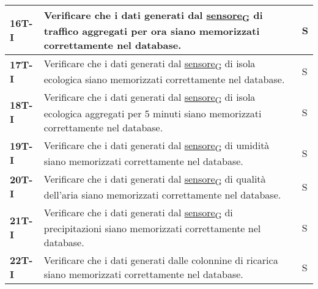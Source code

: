 \begin{longtable}{|>{\raggedright\arraybackslash}m{}|>{\raggedright\arraybackslash}m{}|>{\raggedright\arraybackslash}m{}|}
	\hline
	\textbf{16T-I}  & Verificare che i dati generati dal \href{https://7last.github.io/docs/rtb/documentazione-interna/glossario\#sensore}{sensore\textsubscript{G}} di traffico aggregati per ora siano memorizzati correttamente nel database.                                                                                                          & S              \\
	\hline
	\textbf{17T-I}  & Verificare che i dati generati dal \href{https://7last.github.io/docs/rtb/documentazione-interna/glossario\#sensore}{sensore\textsubscript{G}} di isola ecologica siano memorizzati correttamente nel database.                                                                                                                     & S              \\
	\hline
	\textbf{18T-I}  & Verificare che i dati generati dal \href{https://7last.github.io/docs/rtb/documentazione-interna/glossario\#sensore}{sensore\textsubscript{G}} di isola ecologica aggregati per 5 minuti siano memorizzati correttamente nel database.                                                                                              & S              \\
	\hline
	\textbf{19T-I}  & Verificare che i dati generati dal \href{https://7last.github.io/docs/rtb/documentazione-interna/glossario\#sensore}{sensore\textsubscript{G}} di umidità siano memorizzati correttamente nel database.                                                                                                                             & S              \\
	\hline
	\textbf{20T-I}  & Verificare che i dati generati dal \href{https://7last.github.io/docs/rtb/documentazione-interna/glossario\#sensore}{sensore\textsubscript{G}} di qualità dell'aria siano memorizzati correttamente nel database.                                                                                                                   & S              \\
	\hline
	\textbf{21T-I}  & Verificare che i dati generati dal \href{https://7last.github.io/docs/rtb/documentazione-interna/glossario\#sensore}{sensore\textsubscript{G}} di precipitazioni siano memorizzati correttamente nel database.                                                                                                                      & S              \\
	\hline
	\textbf{22T-I}  & Verificare che i dati generati dalle colonnine di ricarica siano memorizzati correttamente nel database.                                                                                                                                                                                                                            & S              \\

\end{longtable}
